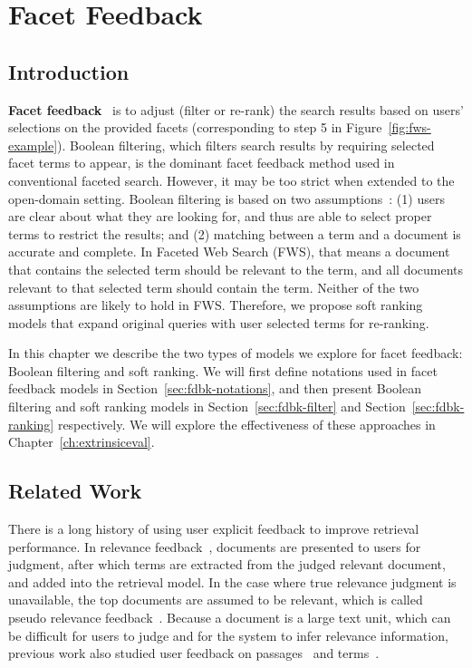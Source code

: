 \chapter{Facet Feedback}
\label{ch:feedback}
\section{Introduction}
\label{sec:fdbk-intro}
\textbf{Facet feedback}~\cite{kong2014extending} is to adjust (filter or re-rank) the search results based on users' selections on the provided facets (corresponding to step 5 in Figure~\ref{fig:fws-example}). Boolean filtering, which filters search results by requiring selected facet terms to appear, is the dominant facet feedback method used in conventional faceted search. However, it may be too strict when extended to the open-domain setting. Boolean filtering is based on two assumptions~\cite{zhang2010interactive}: (1) users are clear about what they are looking for, and thus are able to select proper terms to restrict the results; and (2) matching between a term and a document is accurate and complete. In Faceted Web Search (FWS), that means a document that contains the selected term should be relevant to the term, and all documents relevant to that selected term should contain the term. Neither of the two assumptions are likely to hold in FWS.
Therefore, we propose soft ranking models that expand original queries with user selected terms for re-ranking.

In this chapter we describe the two types of models we explore for facet feedback: Boolean filtering and soft ranking. We will first define notations used in facet feedback models in Section~\ref{sec:fdbk-notations}, and then present Boolean filtering and soft ranking models in Section~\ref{sec:fdbk-filter} and Section~\ref{sec:fdbk-ranking} respectively.  We will explore the effectiveness of these approaches in Chapter~\ref{ch:extrinsiceval}. 

\section{Related Work}
\label{sec:feedback-related}
There is a long history of using user explicit feedback to improve retrieval performance. In relevance feedback~\cite{rocchio71relevance,salton1997improving}, documents are presented to users for judgment, after which terms are extracted from the judged relevant document, and added into the retrieval model. In the case where true relevance judgment is unavailable, the top documents are assumed to be relevant, which is called pseudo relevance feedback~\cite{buckley1995automatic,abdul2004umass}. Because a document is a large text unit, which can be difficult for users to judge and for the system to infer relevance information, previous work also studied user feedback on passages~\cite{allan1995relevance,xu1996query} and terms~\cite{koenemann1996case,tan2007term}. 

